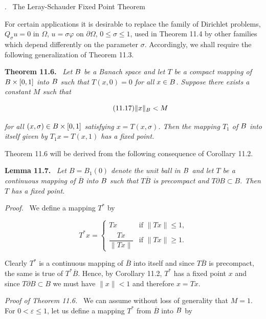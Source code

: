 


. \ The Leray-Schauder Fixed Point Theorem

\medskip

For certain applications it is desirable to replace the family of Dirichlet problems,
$Q_{\sigma}u=0$ in $\Omega$, $u=\sigma\varphi$ on $\partial\Omega$, $0\leq \sigma\leq 1$, used in Theorem 11.4 by other families
which depend differently on the parameter $\sigma$. Accordingly, we shall require the
following generalization of Theorem 11.3.

\medskip

\noindent \textbf{Theorem 11.6.} \ \emph{Let $B$ be a Banach space and let $T$ be a compact mapping of $B\times[0,1]$
into $B$ such that $T(x,0)=0$ for all $x\in B$. Suppose there exists a constant $M$ such that}

\[
\tag{11.17}
\|x\|_{B}<M
\]

\emph{for all $(x,\sigma)\in B\times[0,1]$ satisfying $x=T(x,\sigma)$. Then the mapping $T_{1}$ of $B$ into itself
given by $T_{1}x=T(x,1)$ has a fixed point.}

\medskip

Theorem 11.6 will be derived from the following consequence of Corollary 11.2.

\medskip

\noindent \textbf{Lemma 11.7.} \ \emph{Let $B=B_{1}(0)$ denote the unit ball in $B$ and let $T$ be a continuous
mapping of $\overline{B}$ into $B$ such that $T\overline{B}$ is precompact and $T\partial B\subset B$. Then $T$ has a fixed
point.}

\medskip

\noindent \textit{Proof.} \ We define a mapping $T^{*}$ by

\[
T^{*}x=
\begin{cases}
Tx & \text{if }\|Tx\|\leq 1,\\[0.4em]
\dfrac{Tx}{\|Tx\|} & \text{if }\|Tx\|\geq 1.
\end{cases}
\]

Clearly $T^{*}$ is a continuous mapping of $\overline{B}$ into itself and since $T\overline{B}$ is precompact, the
same is true of $T^{*}\overline{B}$. Hence, by Corollary 11.2, $T^{*}$ has a fixed point $x$ and since
$T\partial B\subset B$ we must have $\|x\|<1$ and therefore $x=Tx$.

\medskip

\noindent \textit{Proof of Theorem 11.6.} \ We can assume without loss of generality that $M=1$.
For $0<\varepsilon\leq 1$, let us define a mapping $T^{*}$ from $\overline{B}$ into $B$ by

